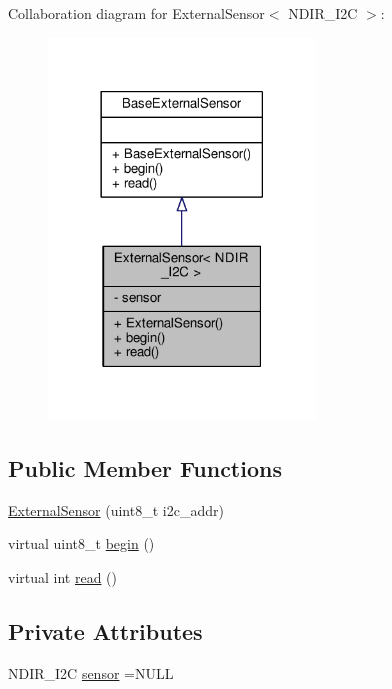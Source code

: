 Collaboration diagram for External\+Sensor$<$ N\+D\+I\+R\+\_\+\+I2C $>$\+:\nopagebreak
\begin{figure}[H]
\begin{center}
\leavevmode
\includegraphics[width=201pt]{classExternalSensor_3_01NDIR__I2C_01_4__coll__graph}
\end{center}
\end{figure}
\subsection*{Public Member Functions}
\begin{DoxyCompactItemize}
\item 
\hyperlink{classExternalSensor_3_01NDIR__I2C_01_4_aa06970ea689679c0e1deb5360e05a0a4}{External\+Sensor} (uint8\+\_\+t i2c\+\_\+addr)
\item 
virtual uint8\+\_\+t \hyperlink{classExternalSensor_3_01NDIR__I2C_01_4_ac6f3614d94968ef0cc11b2b4d69cef03}{begin} ()
\item 
virtual int \hyperlink{classExternalSensor_3_01NDIR__I2C_01_4_add67f5ecaf47d2ee675e8299aee7322d}{read} ()
\end{DoxyCompactItemize}
\subsection*{Private Attributes}
\begin{DoxyCompactItemize}
\item 
N\+D\+I\+R\+\_\+\+I2C \hyperlink{classExternalSensor_3_01NDIR__I2C_01_4_ae541c9cece7c38674b70114cdb74a7dc}{sensor} =N\+U\+LL
\end{DoxyCompactItemize}


